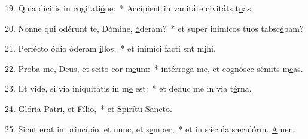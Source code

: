 19. Quia dícitis in cogitati\uline{ó}ne:~* Accípient in vanitáte civitáts t\uline{u}as.\par 
20. Nonne qui odérunt te, Dómine, \uline{ó}deram?~* et super inimícos tuos tabsc\uline{é}bam?\par 
21. Perfécto ódio óderam \uline{i}llos:~* et inimíci facti snt m\uline{i}hi.\par 
22. Proba me, Deus, et scito cor m\uline{e}um:~* intérroga me, et cognósce sémits m\uline{e}as.\par 
23. Et vide, si via iniquitátis in m\uline{e} est:~* et deduc me in via t\uline{é}rna.\par 
24. Glória Patri, et F\uline{í}lio,~* et Spirítu S\uline{a}ncto.\par 
25. Sicut erat in princípio, et nunc, et s\uline{e}mper,~* et in sǽcula sæculórm. \uline{A}men.\par 
